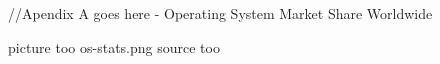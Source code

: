 //Apendix A goes here - Operating System Market Share Worldwide

picture too os-stats.png
source too